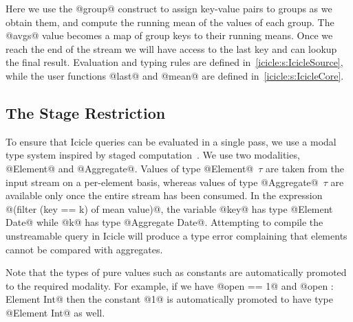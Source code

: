 Here we use the @group@ construct to assign key-value pairs to groups as we obtain them, and compute the running mean of the values of each group. The @avgs@ value becomes a map of group keys to their running means. Once we reach the end of the stream we will have access to the last key and can lookup the final result.
Evaluation and typing rules are defined in~\autoref{icicle:s:IcicleSource}, while the user functions @last@ and @mean@ are defined in~\autoref{icicle:s:IcicleCore}.


\subsection{The Stage Restriction}
To ensure that Icicle queries can be evaluated in a single pass, we use a modal type system inspired by staged computation~\cite{davies2001modal}. We use two modalities, @Element@ and @Aggregate@. Values of type @Element@~$\tau$ are taken from the input stream on a per-element basis, whereas values of type @Aggregate@~$\tau$ are available only once the entire stream has been consumed. In the expression @(filter (key == k) of mean value)@, the variable @key@ has type @Element Date@ while @k@ has type @Aggregate Date@. Attempting to compile the unstreamable query in Icicle will produce a type error complaining that elements cannot be compared with aggregates.

Note that the types of pure values such as constants are automatically promoted to the required modality. For example, if we have @open == 1@ and @open : Element Int@ then the constant @1@ is automatically promoted to have type @Element Int@ as well.


